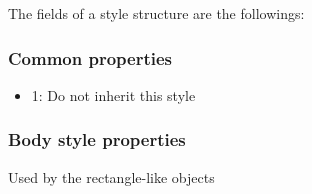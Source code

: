 \documentclass[letterpaper,10pt,english]{sphinxmanual}
\begin{document}
The fields of a style structure are the followings:


\subsubsection{Common properties}
\label{\detokenize{overview/styles:common-properties}}\begin{itemize}
\item {} 
 1: Do not inherit this style

\end{itemize}


\subsubsection{Body style properties}
\label{\detokenize{overview/styles:body-style-properties}}
Used by the rectangle-like objects
\end{document}
